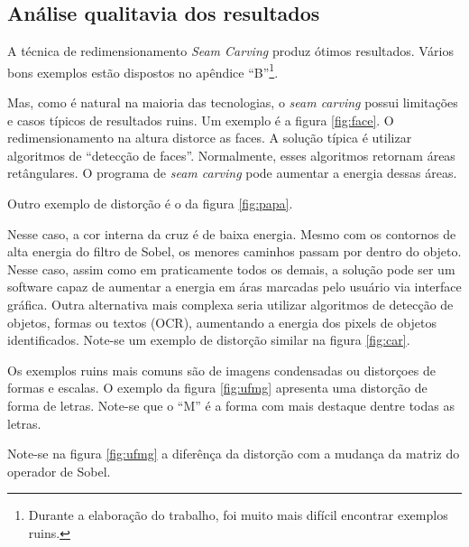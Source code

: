 \subsection{Análise qualitavia dos resultados}

A técnica de redimensionamento {\it Seam Carving} 
produz ótimos resultados.
Vários bons exemplos estão dispostos no apêndice ``B''\footnote{
Durante a elaboração do trabalho,
foi muito mais difícil encontrar exemplos ruins.
}.

Mas, como é natural na maioria das tecnologias, 
o {\it seam carving} possui limitações e casos típicos de 
resultados ruins. 
Um exemplo é a figura \ref{fig:face}\cite{shai2007seam}.
O redimensionamento na altura distorce as faces.
A solução típica é utilizar algoritmos de 
``detecção de faces''.
Normalmente, esses algoritmos retornam áreas retângulares.
O programa de {\it seam carving} pode 
aumentar a energia dessas áreas.


Outro exemplo de distorção é o da figura \ref{fig:papa}.


Nesse caso, 
a cor interna da cruz é de baixa energia.
Mesmo com os contornos de alta energia do filtro de Sobel,
os menores caminhos passam por dentro do objeto.
Nesse caso, assim como em praticamente todos os demais, 
a solução pode ser um software
capaz de aumentar a energia em áras marcadas pelo usuário 
via interface gráfica.
Outra alternativa mais complexa seria utilizar 
algoritmos de detecção de objetos, formas ou textos (OCR), 
aumentando a energia dos pixels de objetos identificados.
Note-se um exemplo de distorção similar na figura \ref{fig:car}.


Os exemplos ruins mais comuns são de imagens condensadas ou
distorçoes de formas e escalas.
O exemplo da figura \ref{fig:ufmg} apresenta uma distorção
de forma de letras.
Note-se que o ``M'' é a forma com mais destaque dentre
todas as letras.


Note-se na figura \ref{fig:ufmg} 
a diferênça da distorção com a mudança 
da matriz do operador de Sobel. 


